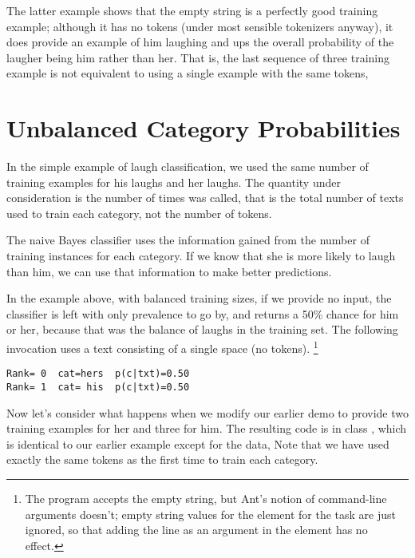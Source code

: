 The latter example shows that the empty string is a perfectly good
training example; although it has no tokens (under most sensible
tokenizers anyway), it does provide an example of him laughing and ups
the overall probability of the laugher being him rather than her.
That is, the last sequence of three training example is not equivalent to
using a single example with the same tokens,
%



\section{Unbalanced Category Probabilities}

In the simple example of laugh classification, we used the same number
of training examples for his laughs and her laughs.  The quantity
under consideration is the number of times  was
called, that is the total number of texts used to train each category,
not the number of tokens.

The naive Bayes classifier uses the information gained from the number
of training instances for each category.  If we know that she is more
likely to laugh than him, we can use that information to make better
predictions.  

In the example above, with balanced training sizes, if we provide no
input, the classifier is left with only prevalence to go by, and
returns a 50\% chance for him or her, because that was the balance of
laughs in the training set.  The following invocation uses a text
consisting of a single space (no tokens).%
%
\footnote{The program accepts the empty string, but Ant's notion of
  command-line arguments doesn't; empty string values for the 
  element for the  task are just ignored, so that adding
  the line  as an argument in the 
  element has no effect.}
%
\begin{verbatim}
Rank= 0  cat=hers  p(c|txt)=0.50
Rank= 1  cat= his  p(c|txt)=0.50
\end{verbatim}
%

Now let's consider what happens when we modify our earlier demo
to provide two training examples for her and three for him.  The
resulting code is in class , which is identical
to our earlier example except for the data,
%
%
%
Note that we have used exactly the same tokens as the first
time to train each category.  


